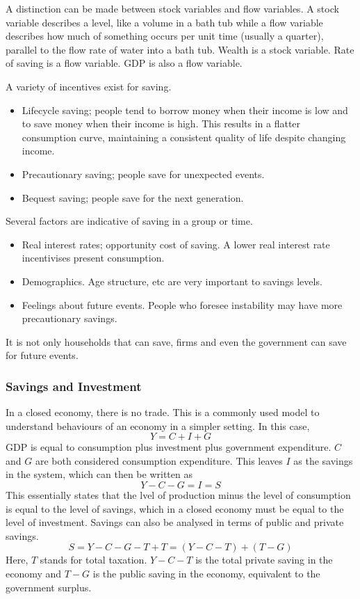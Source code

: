 \documentclass[12pt]{report}
\begin{document}
\begin{flushleft}
\bigskip
A distinction can be made between stock variables and flow variables. A stock
variable describes a level, like a volume in a bath tub while a flow variable
describes how much of something occurs per unit time (usually a quarter), 
parallel to the flow rate of water into a bath tub. Wealth is a stock variable.
Rate of saving is a flow variable. GDP is also a flow variable.

\bigskip
A variety of incentives exist for saving.
\begin{itemize}
    \item Lifecycle saving; people tend to borrow money when their income is
    low and to save money when their income is high. This results in a flatter
    consumption curve, maintaining a consistent quality of life despite 
    changing income.
    \item Precautionary saving; people save for unexpected events.
    \item Bequest saving; people save for the next generation.
\end{itemize}
Several factors are indicative of saving in a group or time.
\begin{itemize}
    \item Real interest rates; opportunity cost of saving. A lower real 
    interest rate incentivises present consumption.
    \item Demographics. Age structure, etc are very important to savings 
    levels.
    \item Feelings about future events. People who foresee instability may have
    more precautionary savings.
\end{itemize}

It is not only households that can save, firms and even the government can save
for future events.

\subsubsection*{Savings and Investment}

In a closed economy, there is no trade. This is a commonly used model to 
understand behaviours of an economy in a simpler setting. In this case,
\[Y = C + I + G\]
GDP is equal to consumption plus investment plus government expenditure. \(C\)
and \(G\) are both considered consumption expenditure. This leaves \(I\) as the
savings in the system, which can then be written as
\[Y - C - G = I = S\]
This essentially states that the lvel of production minus the level of
consumption is equal to the level of savings, which in a closed economy must be
equal to the level of investment. Savings can also be analysed in terms of 
public and private savings.
\[S = Y - C - G - T + T = (Y - C - T) + (T - G)\]
Here, \(T\) stands for total taxation. \(Y - C - T\) is the total private 
saving in the economy and \(T - G\) is the public saving in the economy, 
equivalent to the government surplus.


\end{flushleft}
\end{document}
